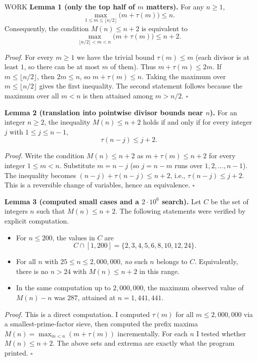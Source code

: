 WORK
\textbf{Lemma 1 (only the top half of $m$ matters).}
For any $n\ge1$,
\[
\max_{1\le m\le \lfloor n/2\rfloor}\bigl(m+\tau(m)\bigr) \le n.
\]
Consequently, the condition $M(n)\le n+2$ is equivalent to
\[
\max_{\lfloor n/2\rfloor < m < n}\bigl(m+\tau(m)\bigr) \le n+2.
\]

\emph{Proof.}
For every $m\ge1$ we have the trivial bound $\tau(m)\le m$ (each divisor is at
least $1$, so there can be at most $m$ of them).
Thus $m+\tau(m)\le 2m$.
If $m\le \lfloor n/2\rfloor$, then $2m\le n$, so $m+\tau(m)\le n$.
Taking the maximum over $m\le \lfloor n/2\rfloor$ gives the first inequality.
The second statement follows because the maximum over all $m<n$ is then attained
among $m>n/2$.
\hfill $\square$

\medskip
\textbf{Lemma 2 (translation into pointwise divisor bounds near $n$).}
For an integer $n\ge2$, the inequality $M(n)\le n+2$ holds if and only if
for every integer $j$ with $1\le j\le n-1$,
\[
\tau(n-j) \le j+2.
\]

\emph{Proof.}
Write the condition $M(n)\le n+2$ as
$m+\tau(m)\le n+2$ for every integer $1\le m<n$.
Substitute $m=n-j$ (so $j=n-m$ runs over $1,2,\dots,n-1$).
The inequality becomes
$(n-j)+\tau(n-j)\le n+2$, i.e., $\tau(n-j)\le j+2$.
This is a reversible change of variables, hence an equivalence.
\hfill $\square$

\medskip
\textbf{Lemma 3 (computed small cases and a $2\cdot 10^6$ search).}
Let $C$ be the set of integers $n$ such that $M(n)\le n+2$.
The following statements were verified by explicit computation.
\begin{itemize}
\item For $n\le 200$, the values in $C$ are
\[
C\cap[1,200]=\{2,3,4,5,6,8,10,12,24\}.
\]
\item For all $n$ with $25\le n\le 2{,}000{,}000$, \emph{no} such $n$ belongs to $C$.
Equivalently, there is no $n>24$ with $M(n)\le n+2$ in this range.
\item In the same computation up to $2{,}000{,}000$, the maximum observed value of
$M(n)-n$ was $287$, attained at $n=1{,}441{,}441$.
\end{itemize}

\emph{Proof.}
This is a direct computation.
I computed $\tau(m)$ for all $m\le 2{,}000{,}000$ via a smallest-prime-factor
sieve, then computed the prefix maxima
$M(n)=\max_{m<n}(m+\tau(m))$ incrementally.
For each $n$ I tested whether $M(n)\le n+2$.
The above sets and extrema are exactly what the program printed.
\hfill $\square$


